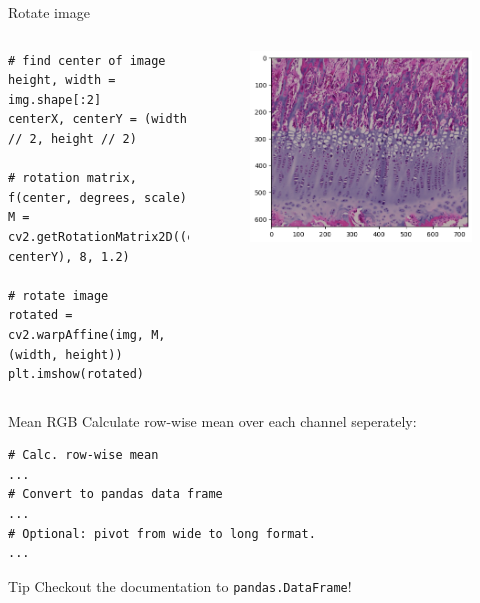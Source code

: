 \documentclass[compress%
,aspectratio=169%
]{beamer}
\begin{document}
\begin{frame}[fragile]{Rotate image}
\begin{columns}
    \begin{lstlisting}
# find center of image
height, width = img.shape[:2]
centerX, centerY = (width // 2, height // 2)

# rotation matrix, f(center, degrees, scale)
M = cv2.getRotationMatrix2D((centerX, centerY), 8, 1.2)

# rotate image
rotated = cv2.warpAffine(img, M, (width, height)) 
plt.imshow(rotated)
\end{lstlisting}
\begin{figure}
    \includegraphics[width = 1\linewidth,left]{img/pig_rotated.png}
\end{figure}
\end{columns}

\end{frame}

\begin{frame}[fragile]{Mean RGB}
Calculate row-wise mean over each channel seperately:
\begin{lstlisting}
# Calc. row-wise mean
...
# Convert to pandas data frame
...
# Optional: pivot from wide to long format.
...
\end{lstlisting}
\begin{alertblock}{Tip}
Checkout the documentation to \texttt{pandas.DataFrame}!
\end{alertblock}
\end{frame}
\end{document}
